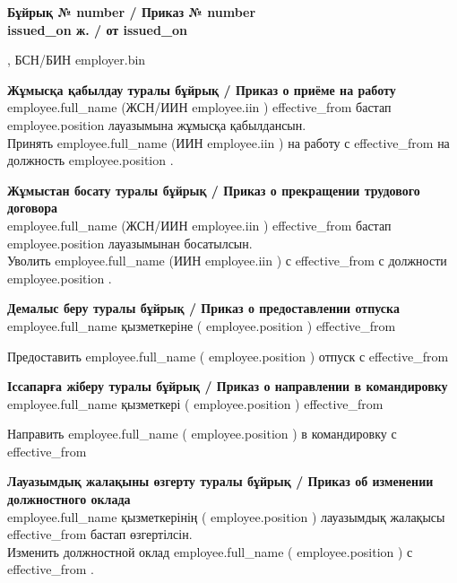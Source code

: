 \documentclass[a4paper,10pt]{article}
\newcommand{\field}[1]{\textbf{#1}}
\begin{document}
\begin{center}\Large\bfseries Бұйрық № {{ number }} / Приказ № {{ number }}\\
\normalsize {{ issued_on }} ж. / от {{ issued_on }}\end{center}
\vspace{4mm}
, БСН/БИН {{ employer.bin }}
\vspace{4mm}

{%
\noindent\field{Жұмысқа қабылдау туралы бұйрық / Приказ о приёме на работу}\\
{{ employee.full_name }} (ЖСН/ИИН {{ employee.iin }}) {{ effective_from }} бастап {{ employee.position }} лауазымына жұмысқа қабылдансын.\\
Принять {{ employee.full_name }} (ИИН {{ employee.iin }}) на работу с {{ effective_from }} на должность {{ employee.position }}.
{%
{%
\noindent\field{Жұмыстан босату туралы бұйрық / Приказ о прекращении трудового договора}\\
{{ employee.full_name }} (ЖСН/ИИН {{ employee.iin }}) {{ effective_from }} бастап {{ employee.position }} лауазымынан босатылсын.\\
Уволить {{ employee.full_name }} (ИИН {{ employee.iin }}) с {{ effective_from }} с должности {{ employee.position }}.
{%
{%
\noindent\field{Демалыс беру туралы бұйрық / Приказ о предоставлении отпуска}\\
{{ employee.full_name }} қызметкеріне ({{ employee.position }}) {{ effective_from }}{%
Предоставить {{ employee.full_name }} ({{ employee.position }}) отпуск с {{ effective_from }}{%
{%
{%
\noindent\field{Іссапарға жіберу туралы бұйрық / Приказ о направлении в командировку}\\
{{ employee.full_name }} қызметкері ({{ employee.position }}) {{ effective_from }}{%
Направить {{ employee.full_name }} ({{ employee.position }}) в командировку с {{ effective_from }}{%
{%
{%
\noindent\field{Лауазымдық жалақыны өзгерту туралы бұйрық / Приказ об изменении должностного оклада}\\
{{ employee.full_name }} қызметкерінің ({{ employee.position }}) лауазымдық жалақысы {{ effective_from }} бастап өзгертілсін.\\
Изменить должностной оклад {{ employee.full_name }} ({{ employee.position }}) с {{ effective_from }}.
{%

}}}}}}}}}}}}}}
\end{document}
